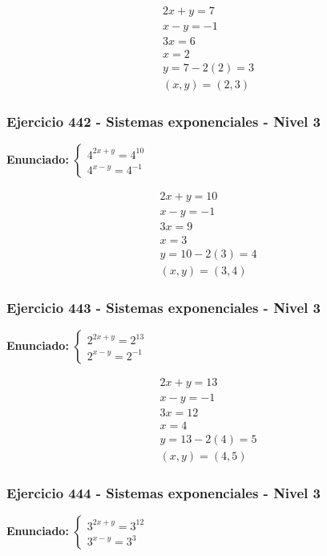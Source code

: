 \documentclass[12pt,a4paper]{article}
\begin{document}
\[
\begin{aligned}
2x+y=7\\
x-y=-1\\
3x=6\\
x=2\\
y=7-2(2)=3\\
\boxed{(x,y)=(2,3)}
\end{aligned}
\]


\subsubsection*{Ejercicio 442 - Sistemas exponenciales - Nivel 3}
\textbf{Enunciado:} \(\begin{cases} 4^{2x+y}=4^{10}\\ 4^{x-y}=4^{-1}\end{cases}\)

\[
\begin{aligned}
2x+y=10\\
x-y=-1\\
3x=9\\
x=3\\
y=10-2(3)=4\\
\boxed{(x,y)=(3,4)}
\end{aligned}
\]


\subsubsection*{Ejercicio 443 - Sistemas exponenciales - Nivel 3}
\textbf{Enunciado:} \(\begin{cases} 2^{2x+y}=2^{13}\\ 2^{x-y}=2^{-1}\end{cases}\)

\[
\begin{aligned}
2x+y=13\\
x-y=-1\\
3x=12\\
x=4\\
y=13-2(4)=5\\
\boxed{(x,y)=(4,5)}
\end{aligned}
\]


\subsubsection*{Ejercicio 444 - Sistemas exponenciales - Nivel 3}
\textbf{Enunciado:} \(\begin{cases} 3^{2x+y}=3^{12}\\ 3^{x-y}=3^{3}\end{cases}\)
\end{document}

